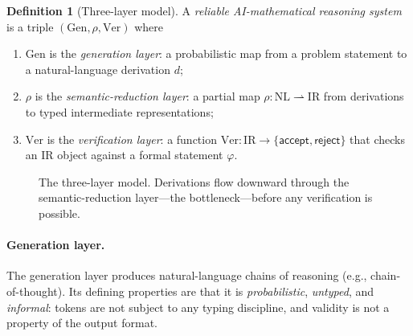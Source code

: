 \documentclass[11pt]{article}
\newcommand{\accept}{\mathsf{accept}}
\newcommand{\reject}{\mathsf{reject}}
\theoremstyle{definition}
\newtheorem{definition}{Definition}[section]
\theoremstyle{plain}
\theoremstyle{remark}
\begin{document}
\begin{definition}[Three-layer model]
A \emph{reliable AI-mathematical reasoning system} is a triple
$(\mathrm{Gen}, \rho, \mathrm{Ver})$ where
\begin{enumerate}[label=(\roman*)]
  \item $\mathrm{Gen}$ is the \emph{generation layer}: a probabilistic map from a problem
        statement to a natural-language derivation $d$;
  \item $\rho$ is the \emph{semantic-reduction layer}: a partial map
        $\rho : \mathrm{NL} \rightharpoonup \mathrm{IR}$ from derivations to typed
        intermediate representations;
  \item $\mathrm{Ver}$ is the \emph{verification layer}: a function
        $\mathrm{Ver} : \mathrm{IR} \to \{\accept, \reject\}$ that checks an IR object against
        a formal statement $\varphi$.
\end{enumerate}
\end{definition}

\begin{figure}[t]
\centering
{}
\caption{The three-layer model. Derivations flow downward through the semantic-reduction
layer---the bottleneck---before any verification is possible.}
\label{fig:layers}
\end{figure}
\paragraph{Generation layer.}
The generation layer produces natural-language chains of reasoning (e.g., chain-of-thought).
Its defining properties are that it is \emph{probabilistic}, \emph{untyped}, and
\emph{informal}: tokens are not subject to any typing discipline, and validity is not a
property of the output format.
\end{document}
